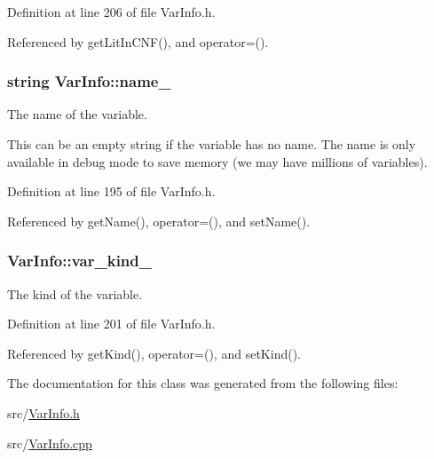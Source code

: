 Definition at line 206 of file Var\-Info.\-h.



Referenced by get\-Lit\-In\-C\-N\-F(), and operator=().

\hypertarget{classVarInfo_a82a85d0c811c2e5501401bd42463371b}{
\subsubsection[{name\-\_\-}]{\setlength{\rightskip}{0pt plus 5cm}string Var\-Info\-::name\-\_\-\hspace{0.3cm}{\ttfamily [protected]}}}\label{classVarInfo_a82a85d0c811c2e5501401bd42463371b}


The name of the variable. 

This can be an empty string if the variable has no name. The name is only available in debug mode to save memory (we may have millions of variables). 

Definition at line 195 of file Var\-Info.\-h.



Referenced by get\-Name(), operator=(), and set\-Name().

\hypertarget{classVarInfo_aabed2d542c10abb83514e4592913b431}{
\subsubsection[{var\-\_\-kind\-\_\-}]{ Var\-Info\-::var\-\_\-kind\-\_\-\hspace{0.3cm}{\ttfamily [protected]}}}\label{classVarInfo_aabed2d542c10abb83514e4592913b431}


The kind of the variable. 



Definition at line 201 of file Var\-Info.\-h.



Referenced by get\-Kind(), operator=(), and set\-Kind().



The documentation for this class was generated from the following files\-:\begin{DoxyCompactItemize}
\item 
src/\hyperlink{VarInfo_8h}{Var\-Info.\-h}\item 
src/\hyperlink{VarInfo_8cpp}{Var\-Info.\-cpp}\end{DoxyCompactItemize}
